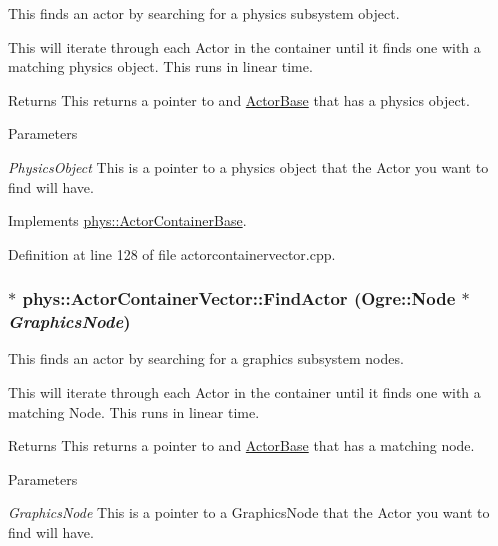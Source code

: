 This finds an actor by searching for a physics subsystem object. 

This will iterate through each Actor in the container until it finds one with a matching physics object. This runs in linear time. \begin{DoxyReturn}{Returns}
This returns a pointer to and \hyperlink{classphys_1_1ActorBase}{ActorBase} that has a physics object. 
\end{DoxyReturn}

\begin{DoxyParams}{Parameters}
\item[{\em PhysicsObject}]This is a pointer to a physics object that the Actor you want to find will have. \end{DoxyParams}


Implements \hyperlink{classphys_1_1ActorContainerBase_a9ba6e38e0f12ada968cfee72fe5144d4}{phys::ActorContainerBase}.



Definition at line 128 of file actorcontainervector.cpp.

\hypertarget{classphys_1_1ActorContainerVector_ad01cf1452bda36cee175ae0e54d509cc}{
\subsubsection[{FindActor}]{ $\ast$ phys::ActorContainerVector::FindActor (Ogre::Node $\ast$ {\em GraphicsNode})}}
\label{d3/d64/classphys_1_1ActorContainerVector_ad01cf1452bda36cee175ae0e54d509cc}


This finds an actor by searching for a graphics subsystem nodes. 

This will iterate through each Actor in the container until it finds one with a matching Node. This runs in linear time. \begin{DoxyReturn}{Returns}
This returns a pointer to and \hyperlink{classphys_1_1ActorBase}{ActorBase} that has a matching node. 
\end{DoxyReturn}

\begin{DoxyParams}{Parameters}
\item[{\em GraphicsNode}]This is a pointer to a GraphicsNode that the Actor you want to find will have. \end{DoxyParams}



